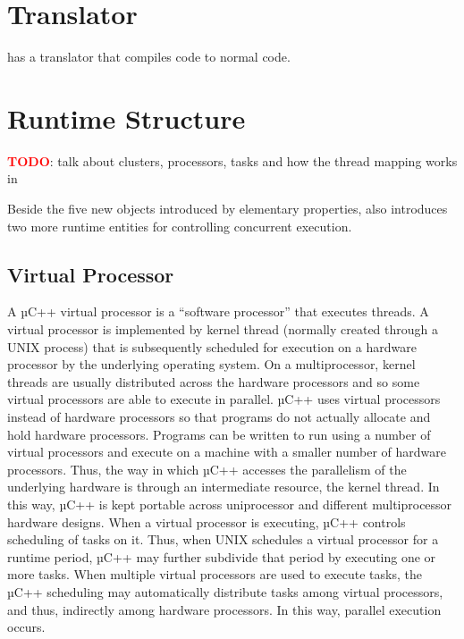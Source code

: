 \section{\uCPPS Translator}
\uCPP has a translator that compiles \uCCS code to normal \CCS code.
\section{\uCPPS Runtime Structure}
\textbf{\textcolor{red}{TODO}}: talk about clusters, processors, tasks and how
the thread mapping works in \uCPPS

Beside the five new objects introduced by elementary properties, \uCPPS also
introduces two more runtime entities for controlling concurrent execution.

\subsection{Virtual Processor}
A µC++ virtual processor is a “software processor” that executes threads. A
virtual processor is implemented by kernel
thread (normally created through a UNIX process) that is subsequently scheduled
for execution on a hardware
    processor by the underlying operating system. On a multiprocessor, kernel
    threads are usually distributed across the hardware processors and so some
    virtual processors are able to execute in parallel. µC++ uses virtual
    processors instead
    of hardware processors so that programs do not actually allocate and hold
    hardware processors. Programs can
    be written to run using a number of virtual processors and execute on a
    machine with a smaller number of hardware
    processors. Thus, the way in which µC++ accesses the parallelism of the
    underlying hardware is through an intermediate
    resource, the kernel thread. In this way, µC++ is kept portable across
    uniprocessor and different multiprocessor
    hardware designs.
    When a virtual processor is executing, µC++ controls scheduling of tasks on
    it. Thus, when UNIX schedules a
    virtual processor for a runtime period, µC++ may further subdivide that
    period by executing one or more tasks. When
    multiple virtual processors are used to execute tasks, the µC++ scheduling
    may automatically distribute tasks among
    virtual processors, and thus, indirectly among hardware processors. In this
    way, parallel execution occurs.
